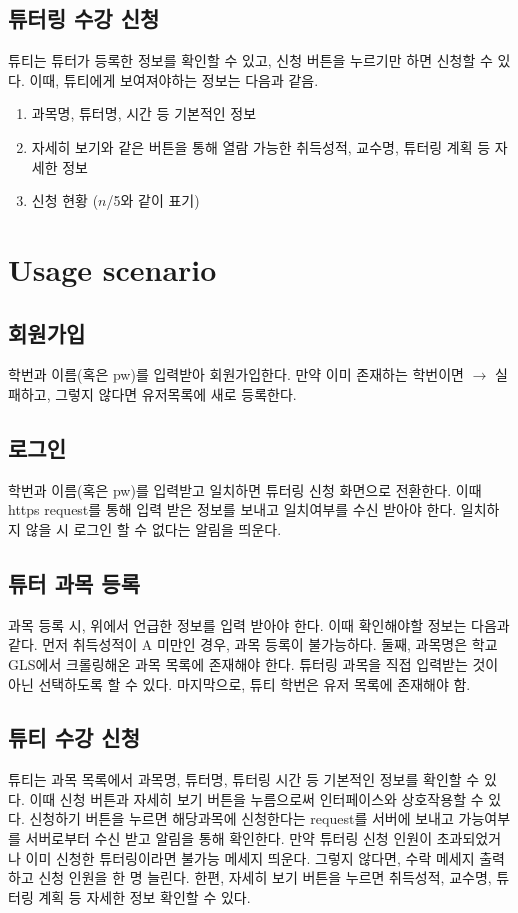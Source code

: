 \documentclass{lxaiproposal}
\begin{document}
\subsection{튜터링 수강 신청}
튜티는 튜터가 등록한 정보를 확인할 수 있고, 신청 버튼을 누르기만 하면 신청할 수 있다.
이때, 튜티에게 보여져야하는 정보는 다음과 같음.
\begin{enumerate}
    \item 과목명, 튜터명, 시간 등 기본적인 정보
    \item 자세히 보기와 같은 버튼을 통해 열람 가능한 취득성적, 교수명, 튜터링 계획 등 자세한 정보
    \item 신청 현황 ($n$/5와 같이 표기)
\end{enumerate}

\section{Usage scenario}
\vspace*{-3mm}
\subsection{회원가입}
학번과 이름(혹은 pw)를 입력받아 회원가입한다.
만약 이미 존재하는 학번이면 $\rightarrow$ 실패하고, 그렇지 않다면 유저목록에 새로 등록한다.

\subsection{로그인}
학번과 이름(혹은 pw)를 입력받고 일치하면 튜터링 신청 화면으로 전환한다. 이때 https request를 통해 입력 받은 정보를 보내고 일치여부를 수신 받아야 한다. 일치하지 않을 시 로그인 할 수 없다는 알림을 띄운다.

\subsection{튜터 과목 등록}
과목 등록 시, 위에서 언급한 정보를 입력 받아야 한다. 이때 확인해야할 정보는 다음과 같다.
먼저 취득성적이 A 미만인 경우, 과목 등록이 불가능하다. 둘째, 과목명은 학교 GLS에서 크롤링해온 과목 목록에 존재해야 한다. 튜터링 과목을 직접 입력받는 것이 아닌 선택하도록 할 수 있다.
마지막으로, 튜티 학번은 유저 목록에 존재해야 함.

\subsection{튜티 수강 신청}
튜티는 과목 목록에서 과목명, 튜터명, 튜터링 시간 등 기본적인 정보를 확인할 수 있다.
이때 신청 버튼과 자세히 보기 버튼을 누름으로써 인터페이스와 상호작용할 수 있다. 
신청하기 버튼을 누르면 해당과목에 신청한다는 request를 서버에 보내고 가능여부를 서버로부터 수신 받고 알림을 통해 확인한다.
만약 튜터링 신청 인원이 초과되었거나 이미 신청한 튜터링이라면 불가능 메세지 띄운다. 그렇지 않다면, 수락 메세지 출력하고 신청 인원을 한 명 늘린다.
한편, 자세히 보기 버튼을 누르면 취득성적, 교수명, 튜터링 계획 등 자세한 정보 확인할 수 있다.
\end{document}
